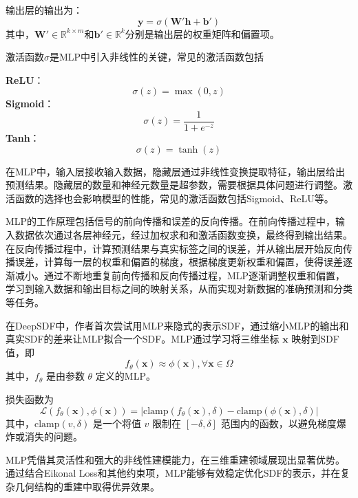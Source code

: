 \documentclass{xduugthesis}
\begin{document}
输出层的输出为：
\begin{equation}
\mathbf{y} = \sigma(\mathbf{W'}\mathbf{h} + \mathbf{b'})
\end{equation}
其中，\( \mathbf{W'} \in \mathbb{R}^{k \times m} \)和\( \mathbf{b'} \in \mathbb{R}^k \)分别是输出层的权重矩阵和偏置项。

激活函数\( \sigma \)是MLP中引入非线性的关键，常见的激活函数包括

\textbf{ReLU}：
\begin{equation}
\sigma(z) = \max(0, z)
\end{equation}
\textbf{Sigmoid}：
\begin{equation}
\sigma(z) = \frac{1}{1 + e^{-z}}
\end{equation}
\textbf{Tanh}：
\begin{equation}
\sigma(z) = \tanh(z)
\end{equation}

在MLP中，输入层接收输入数据，隐藏层通过非线性变换提取特征，输出层给出预测结果。隐藏层的数量和神经元数量是超参数，需要根据具体问题进行调整。激活函数的选择也会影响模型的性能，常见的激活函数包括Sigmoid、ReLU等。

MLP的工作原理包括信号的前向传播和误差的反向传播。在前向传播过程中，输入数据依次通过各层神经元，经过加权求和和激活函数变换，最终得到输出结果。在反向传播过程中，计算预测结果与真实标签之间的误差，并从输出层开始反向传播误差，计算每一层的权重和偏置的梯度，根据梯度更新权重和偏置，使得误差逐渐减小。通过不断地重复前向传播和反向传播过程，MLP逐渐调整权重和偏置，学习到输入数据和输出目标之间的映射关系，从而实现对新数据的准确预测和分类等任务。

在DeepSDF中，作者首次尝试用MLP来隐式的表示SDF，通过缩小MLP的输出和真实SDF的差来让MLP拟合一个SDF。MLP通过学习将三维坐标 \(\mathbf{x}\) 映射到SDF值，即
\begin{equation}
f_\theta(\mathbf{x}) \approx \phi(\mathbf{x}), \forall \mathbf{x} \in \Omega 
\end{equation}
其中，\( f_\theta \) 是由参数 \(\theta\) 定义的MLP。

损失函数为
\begin{equation}
\mathcal{L}(f_\theta(\mathbf{x}), \phi(\mathbf{x})) = \left| \text{clamp}(f_\theta(\mathbf{x}), \delta) - \text{clamp}(\phi(\mathbf{x}), \delta) \right| 
\end{equation}
其中，\(\text{clamp}(v, \delta)\) 是一个将值 \(v\) 限制在 \([- \delta, \delta]\) 范围内的函数，以避免梯度爆炸或消失的问题。 

MLP凭借其灵活性和强大的非线性建模能力，在三维重建领域展现出显著优势。通过结合Eikonal Loss和其他约束项，MLP能够有效稳定优化SDF的表示，并在复杂几何结构的重建中取得优异效果。
\end{document}
